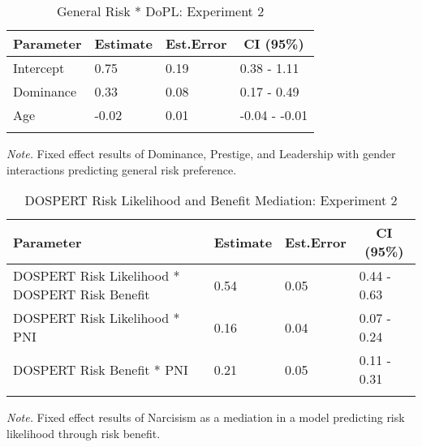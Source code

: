 \documentclass[
  donotrepeattitle,doc, 12pt, a4paper,floatsintext]{apa7}
\begin{document}
\begin{table}[ht]

\begin{center}
\begin{threeparttable}

\caption{\label{tab:PNI-Model-DoPL-Exp-2}General Risk * DoPL: Experiment 2}

\small{

\begin{tabular}{llll}
\toprule
Parameter & \multicolumn{1}{c}{Estimate} & \multicolumn{1}{c}{Est.Error} & \multicolumn{1}{c}{CI (95\%)}\\
\midrule
Intercept & 0.75 & 0.19 & 0.38 - 1.11\\
Dominance & 0.33 & 0.08 & 0.17 - 0.49\\
Age & -0.02 & 0.01 & -0.04 - -0.01\\
\bottomrule
\addlinespace
\end{tabular}

}

\begin{tablenotes}[para]
\normalsize{\textit{Note.} Fixed effect results of Dominance, Prestige, and Leadership with gender interactions predicting general risk preference.}
\end{tablenotes}

\end{threeparttable}
\end{center}

\end{table}

\begin{table}[ht]

\begin{center}
\begin{threeparttable}

\caption{\label{tab:MediationBRMS1Exp2}DOSPERT Risk Likelihood and Benefit Mediation: Experiment 2}

\small{

\begin{tabular}{llll}
\toprule
Parameter & \multicolumn{1}{c}{Estimate} & \multicolumn{1}{c}{Est.Error} & \multicolumn{1}{c}{CI (95\%)}\\
\midrule
DOSPERT Risk Likelihood * DOSPERT Risk Benefit & 0.54 & 0.05 & 0.44 - 0.63\\
DOSPERT Risk Likelihood * PNI & 0.16 & 0.04 & 0.07 - 0.24\\
DOSPERT Risk Benefit * PNI & 0.21 & 0.05 & 0.11 - 0.31\\
\bottomrule
\addlinespace
\end{tabular}

}

\begin{tablenotes}[para]
\normalsize{\textit{Note.} Fixed effect results of Narcisism as a mediation in a model predicting risk likelihood through risk benefit.}
\end{tablenotes}

\end{threeparttable}
\end{center}

\end{table}
\end{document}
